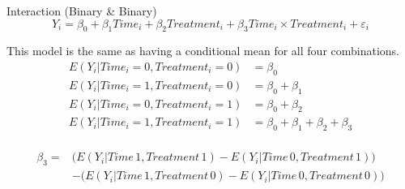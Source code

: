 \documentclass{clbeamer2024}
\begin{document}
\begin{frame}{Interaction (Binary \& Binary)}
    \begin{equation*}
        Y_i = \beta_0 + \beta_1 \textit{Time}_i + \beta_2 \textit{Treatment}_i
            + \beta_3 \textit{Time}_i \times \textit{Treatment}_i + \varepsilon_i
    \end{equation*}

    This model is the same as having a conditional mean for all four combinations.
    \begin{equation*}
    \begin{split}
        E(Y_i | \textit{Time}_i = 0, \textit{Treatment}_i = 0) & = \beta_0 \\
        E(Y_i | \textit{Time}_i = 1, \textit{Treatment}_i = 0) & = \beta_0 + \beta_1 \\
        E(Y_i | \textit{Time}_i = 0, \textit{Treatment}_i = 1) & = \beta_0 + \beta_2 \\
        E(Y_i | \textit{Time}_i = 1, \textit{Treatment}_i = 1) & = \beta_0 + \beta_1 + \beta_2 + \beta_3 \\
    \end{split}
    \end{equation*}

    \begin{center}
    \end{center}

    \pause
    \begin{equation*}
    \begin{split}
        \beta_3 = & \Big(
            E(Y_i | \textit{Time}\,1, \textit{Treatment}\,1)
            - E(Y_i | \textit{Time}\,0, \textit{Treatment}\,1)
        \Big) \\
        & - \Big(
            E(Y_i | \textit{Time}\,1, \textit{Treatment}\,0)
            - E(Y_i | \textit{Time}\,0, \textit{Treatment}\,0)
        \Big)
    \end{split}
    \end{equation*}
\end{frame}
\end{document}
